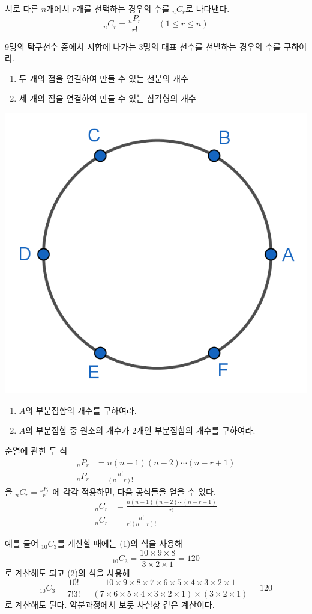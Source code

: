 \documentclass{oblivoir}
\begin{document}
\begin{mdframed}
%
\label{comb4}
\hspace{-.7em}
서로 다른 \(n\)개에서 \(r\)개를 선택하는 경우의 수를 \(_nC_r\)로 나타낸다.
\[_nC_r=\frac{_nP_r}{r!}\qquad(1\le r\le n)\]
\end{mdframed}

%
\prob{}\label{comb5}
9명의 탁구선수 중에서 시합에 나가는 3명의 대표 선수를 선발하는 경우의 수를 구하여라.

%
\begin{enumerate}\label{comb6}
\item
두 개의 점을 연결하여 만들 수 있는 선분의 개수
\item
세 개의 점을 연결하여 만들 수 있는 삼각형의 개수
\end{enumerate}
\begin{center}
\includegraphics[width=.2\textwidth]{comb_6}
\end{center}

%
\begin{enumerate}\label{comb7}
\item
\(A\)의 부분집합의 개수를 구하여라.
\item
\(A\)의 부분집합 중 원소의 개수가 2개인 부분집합의 개수를 구하여라.
\end{enumerate}

\newpage
순열에 관한 두 식
\begin{align*}
_nP_r&=n(n-1)(n-2)\cdots(n-r+1)\\
_nP_r&=\frac{n!}{(n-r)!}
\end{align*}
을 \(_nC_r=\frac{_nP_r}{r!}\)
에 각각 적용하면, 다음 공식들을 얻을 수 있다.
\begin{align}
_nC_r&=\frac{n(n-1)(n-2)\cdots(n-r+1)}{r!}\\
_nC_r&=\frac{n!}{r!(n-r)!}
\end{align}

%
\exam{}\label{comb8}
예를 들어 \(_{10}C_3\)를 계산할 때에는 (1)의 식을 사용해
\[_{10}C_3=\frac{10\times9\times8}{3\times2\times1}=120\]
로 계산해도 되고 (2)의 식을 사용해
\[_{10}C_3=\frac{10!}{7!3!}=\frac{10\times9\times8\times7\times6\times5\times4\times3\times2\times1}
{\left(7\times6\times5\times4\times3\times2\times1\right)\times\left(3\times2\times1\right)}=120\]
로 계산해도 된다.
약분과정에서 보듯 사실상 같은 계산이다.
\end{document}
